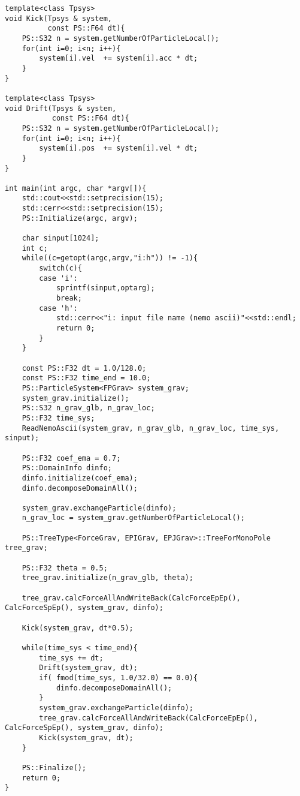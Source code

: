 \begin{lstlisting}[caption=$N$体シミュレーションのサンプルコード]
template<class Tpsys>
void Kick(Tpsys & system,
          const PS::F64 dt){
    PS::S32 n = system.getNumberOfParticleLocal();
    for(int i=0; i<n; i++){
        system[i].vel  += system[i].acc * dt;
    }
}

template<class Tpsys>
void Drift(Tpsys & system,
           const PS::F64 dt){
    PS::S32 n = system.getNumberOfParticleLocal();
    for(int i=0; i<n; i++){
        system[i].pos  += system[i].vel * dt;
    }
}

int main(int argc, char *argv[]){
    std::cout<<std::setprecision(15);
    std::cerr<<std::setprecision(15);
    PS::Initialize(argc, argv);

    char sinput[1024];
    int c;
    while((c=getopt(argc,argv,"i:h")) != -1){
        switch(c){
        case 'i':
            sprintf(sinput,optarg);
            break;
        case 'h':
            std::cerr<<"i: input file name (nemo ascii)"<<std::endl;
            return 0;
        }
    }

    const PS::F32 dt = 1.0/128.0;
    const PS::F32 time_end = 10.0;
    PS::ParticleSystem<FPGrav> system_grav;
    system_grav.initialize();
    PS::S32 n_grav_glb, n_grav_loc;
    PS::F32 time_sys;
    ReadNemoAscii(system_grav, n_grav_glb, n_grav_loc, time_sys, sinput);

    PS::F32 coef_ema = 0.7;
    PS::DomainInfo dinfo;
    dinfo.initialize(coef_ema);
    dinfo.decomposeDomainAll();

    system_grav.exchangeParticle(dinfo);
    n_grav_loc = system_grav.getNumberOfParticleLocal();

    PS::TreeType<ForceGrav, EPIGrav, EPJGrav>::TreeForMonoPole tree_grav;

    PS::F32 theta = 0.5;
    tree_grav.initialize(n_grav_glb, theta);

    tree_grav.calcForceAllAndWriteBack(CalcForceEpEp(), CalcForceSpEp(), system_grav, dinfo);

    Kick(system_grav, dt*0.5);

    while(time_sys < time_end){
        time_sys += dt;
        Drift(system_grav, dt);
        if( fmod(time_sys, 1.0/32.0) == 0.0){
            dinfo.decomposeDomainAll();
        }
        system_grav.exchangeParticle(dinfo);
        tree_grav.calcForceAllAndWriteBack(CalcForceEpEp(), CalcForceSpEp(), system_grav, dinfo);
        Kick(system_grav, dt);
    }

    PS::Finalize();
    return 0;
}

\end{lstlisting}


